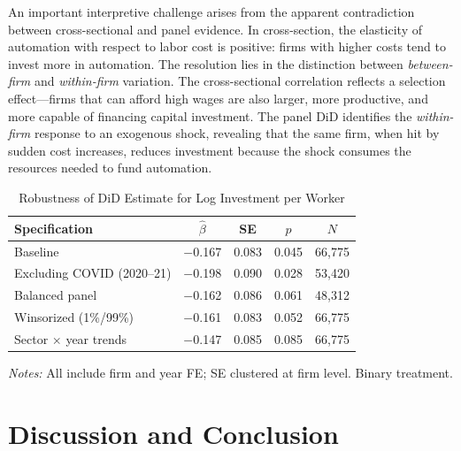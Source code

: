 \documentclass[a4paper,fleqn]{cas-sc}
\begin{document}
An important interpretive challenge arises from the apparent contradiction between cross-sectional and panel evidence. In cross-section, the elasticity of automation with respect to labor cost is positive: firms with higher costs tend to invest more in automation. The resolution lies in the distinction between \emph{between-firm} and \emph{within-firm} variation. The cross-sectional correlation reflects a selection effect---firms that can afford high wages are also larger, more productive, and more capable of financing capital investment. The panel DiD identifies the \emph{within-firm} response to an exogenous shock, revealing that the same firm, when hit by sudden cost increases, reduces investment because the shock consumes the resources needed to fund automation.

\begin{table}[htbp]
\centering
\begin{threeparttable}
\caption{Robustness of DiD Estimate for Log Investment per Worker}
\label{tab:robustness}
\begin{tabular}{lcccc}
\toprule
Specification & $\hat{\beta}$ & SE & $p$ & $N$ \\
\midrule
Baseline & $-$0.167 & 0.083 & 0.045 & 66,775 \\
Excluding COVID (2020--21) & $-$0.198 & 0.090 & 0.028 & 53,420 \\
Balanced panel & $-$0.162 & 0.086 & 0.061 & 48,312 \\
Winsorized (1\%/99\%) & $-$0.161 & 0.083 & 0.052 & 66,775 \\
Sector $\times$ year trends & $-$0.147 & 0.085 & 0.085 & 66,775 \\
\bottomrule
\end{tabular}
\begin{tablenotes}
\small
\item \textit{Notes:} All include firm and year FE; SE clustered at firm level. Binary treatment.
\end{tablenotes}
\end{threeparttable}
\end{table}

\FloatBarrier


\section{Discussion and Conclusion}
\label{sec:discussion}
\end{document}

